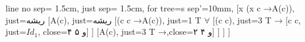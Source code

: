 \documentclass[]{exam}
\newcommand*{\lif}{\ensuremath{\mathbin{\rightarrow}}}
\begin{document}

\begin{tableau}
    {line no sep= 1.5cm,
        just sep= 1.5cm,
        for tree={s sep'=10mm},
    }
    [{\forall x \: (x \approx c \lif A(c))}, just={ریشه}
    [{\neg A(c)}, just={ریشه}
    [(c \approx c \lif A(c)), just={1 T $\forall$}
        [{\neg (c \approx c)}, just={3 T $\lif$}
        [{c \approx c}, just={$Id_1$}, close={۴ و ۵}]
        ]
        [{A(c)}, just={3 T $\lif$},close={۲ و ۴}]
    ]
    ]
    ]
\end{tableau}
\end{document}

